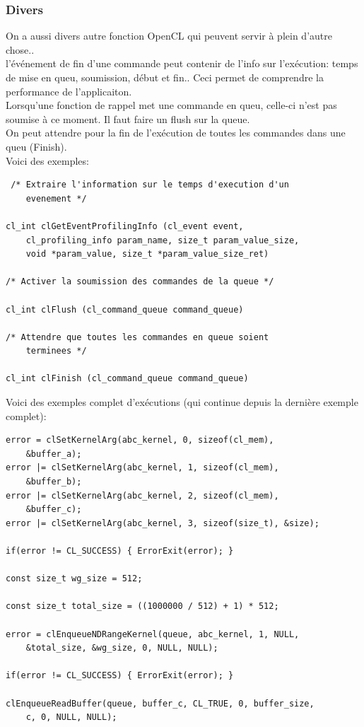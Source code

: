 \documentclass[oneside]{book}
\begin{document}
\subsubsection{Divers}
On a aussi divers autre fonction OpenCL qui peuvent servir à plein d'autre chose..\\

l'événement de fin d'une commande peut contenir de l'info sur l'exécution: temps de mise en queu, soumission, début et fin.. Ceci permet de comprendre la performance de l'applicaiton. \\

 Lorsqu'une fonction de rappel met une commande en queu, celle-ci n'est pas soumise à ce moment. Il faut faire un flush sur la queue.\\
 
 On peut attendre pour la fin de l'exécution de toutes les commandes dans une queu (Finish).\\
 
 Voici des exemples:
 \begin{lstlisting}
 /* Extraire l'information sur le temps d'execution d'un
	evenement */

cl_int clGetEventProfilingInfo (cl_event event,
	cl_profiling_info param_name, size_t param_value_size,
	void *param_value, size_t *param_value_size_ret)

/* Activer la soumission des commandes de la queue */

cl_int clFlush (cl_command_queue command_queue)

/* Attendre que toutes les commandes en queue soient
	terminees */

cl_int clFinish (cl_command_queue command_queue)
 \end{lstlisting}
Voici des exemples complet d'exécutions (qui continue depuis la dernière exemple complet):
\begin{lstlisting}
error = clSetKernelArg(abc_kernel, 0, sizeof(cl_mem),
	&buffer_a);
error |= clSetKernelArg(abc_kernel, 1, sizeof(cl_mem),
	&buffer_b);
error |= clSetKernelArg(abc_kernel, 2, sizeof(cl_mem),
	&buffer_c);
error |= clSetKernelArg(abc_kernel, 3, sizeof(size_t), &size);

if(error != CL_SUCCESS) { ErrorExit(error); }

const size_t wg_size = 512;

const size_t total_size = ((1000000 / 512) + 1) * 512;

error = clEnqueueNDRangeKernel(queue, abc_kernel, 1, NULL,
	&total_size, &wg_size, 0, NULL, NULL);

if(error != CL_SUCCESS) { ErrorExit(error); }

clEnqueueReadBuffer(queue, buffer_c, CL_TRUE, 0, buffer_size,
	c, 0, NULL, NULL);
\end{lstlisting}
\end{document}
